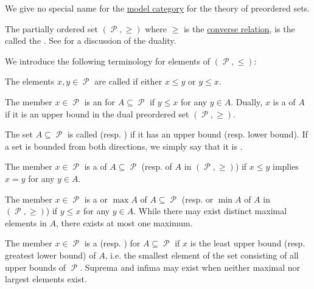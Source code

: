 \begin{definition}
\begin{thmenum}[series=def:preordered_set]
     We give no special name for the \hyperref[def:first_order_model_category]{model category} for the theory of preordered sets.

     The partially ordered set \( (\mscrP, \geq) \) where \( \geq \) is the \hyperref[def:binary_relation/converse]{converse relation}, is the called the . See  for a discussion of the duality.
  \end{thmenum}

  We introduce the following terminology for elements of \( (\mscrP, \leq) \):
  \begin{thmenum}[resume=def:preordered_set]
     The elements \( x, y \in \mscrP \) are called  if either \( x \leq y \) or \( y \leq x \).

     The member \( x \in \mscrP \) is an  for \( A \subseteq \mscrP \) if \( y \leq x \) for any \( y \in A \). Dually, \( x \) is a  of \( A \) if it is an upper bound in the dual preordered set \( (\mscrP, \geq) \).

     The set \( A \subseteq \mscrP \) is called  (resp. ) if it has an upper bound (resp. lower bound). If a set is bounded from both directions, we simply say that it is .

     The member \( x \in \mscrP \) is a  of \( A \subseteq \mscrP \) (resp.  of \( A \) in \( (\mscrP, \geq) \)) if \( x \leq y \) implies \( x = y \) for any \( y \in A \).

     The member \( x \in \mscrP \) is a  or  \( \max A \) of \( A \subseteq \mscrP \) (resp.  or  \( \min A \) of \( A \) in \( (\mscrP, \geq) \)) if \( y \leq x \) for any \( y \in A \). While there may exist distinct maximal elements in \( A \), there exists at most one maximum.

     The member \( x \in \mscrP \) is a  (resp. ) for \( A \subseteq \mscrP \) if \( x \) is the least upper bound (resp. greatest lower bound) of \( A \), i.e. the smallest element of the set consisting of all upper bounds of \( \mscrP \). Suprema and infima may exist when neither maximal nor largest elements exist.
  \end{thmenum}
\end{definition}

